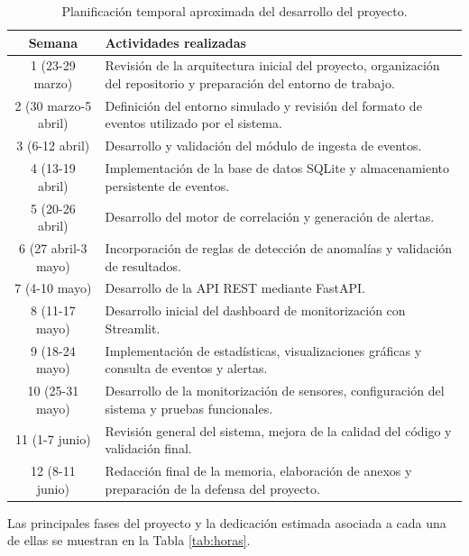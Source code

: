 \begin{table}[H]
	\centering
	\begin{tabular}{|c|p{9cm}|}
		\hline
		\textbf{Semana} & \textbf{Actividades realizadas} \\
		\hline
		1 (23-29 marzo) & Revisión de la arquitectura inicial del proyecto, organización del repositorio y preparación del entorno de trabajo. \\
		\hline
		2 (30 marzo-5 abril) & Definición del entorno simulado y revisión del formato de eventos utilizado por el sistema. \\
		\hline
		3 (6-12 abril) & Desarrollo y validación del módulo de ingesta de eventos. \\
		\hline
		4 (13-19 abril) & Implementación de la base de datos SQLite y almacenamiento persistente de eventos. \\
		\hline
		5 (20-26 abril) & Desarrollo del motor de correlación y generación de alertas. \\
		\hline
		6 (27 abril-3 mayo) & Incorporación de reglas de detección de anomalías y validación de resultados. \\
		\hline
		7 (4-10 mayo) & Desarrollo de la API REST mediante FastAPI. \\
		\hline
		8 (11-17 mayo) & Desarrollo inicial del dashboard de monitorización con Streamlit. \\
		\hline
		9 (18-24 mayo) & Implementación de estadísticas, visualizaciones gráficas y consulta de eventos y alertas. \\
		\hline
		10 (25-31 mayo) & Desarrollo de la monitorización de sensores, configuración del sistema y pruebas funcionales. \\
		\hline
		11 (1-7 junio) & Revisión general del sistema, mejora de la calidad del código y validación final. \\
		\hline
		12 (8-11 junio) & Redacción final de la memoria, elaboración de anexos y preparación de la defensa del proyecto. \\
		\hline
	\end{tabular}
	\caption{Planificación temporal aproximada del desarrollo del proyecto.}
	\label{tab:planificacion}
\end{table}

Las principales fases del proyecto y la dedicación estimada asociada a cada una de ellas se muestran en la Tabla \ref{tab:horas}.

